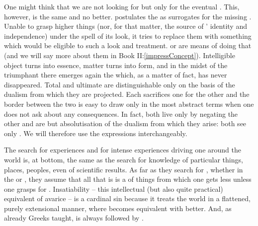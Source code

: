One might think that we are not looking for  but only
for the eventual . This, however, is the same and no better.
 postulates the  as surrogates for the
missing . Unable to grasp higher things (nor, for that matter,
the source of ' identity and independence) under the 
spell of its  look, it tries to replace them with something
which would be eligible to such a look and treatment.   or
 are means of doing that (and we will say more about them in Book
II:\ref{impressConcept}).  Intelligible object turns into essence, matter turns
into form, and in the midst of the triumphant  there emerges
again the  which, as a matter of fact, has never disappeared. Total
 and ultimate  are distinguishable only on the
basis of the  dualism from which they are projected. Each
sacrifices one  for the other and the border between the two is easy
to draw only in the most abstract terms when one does not ask about any
consequences. In fact, both live only by negating the other  and are
but absolutisation of the dualism from which they arise: both see only
. We will therefore use the expressions
 interchangeably.

 The search for  experiences and for  intense experiences
driving one around the world is, at bottom, the same as the search for 
knowledge of particular things, places, peoples, even of scientific results. As far as
they search for , whether in the  or , they assume that all that is is a  of things 
from which one gets less unless one grasps for .  Insatiability --
this intellectual (but also quite practical) equivalent of avarice -- is a
cardinal sin because it treats the world in a flattened, purely extensional
manner, where  becomes equivalent with {better}.  And, as already
Greeks taught,  is always followed by
.

